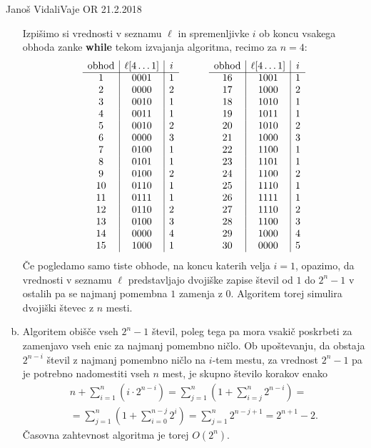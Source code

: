 \begin{naloga}{Janoš Vidali}{Vaje OR 21.2.2018}
\begin{odgovor}
\begin{enumerate}[(a)]
Izpišimo si vrednosti v seznamu $\ell$ in spremenljivke $i$
ob koncu vsakega obhoda zanke {\bf while} tekom izvajanja algoritma,
recimo za $n = 4$:
$$
\begin{array}{c|c|ccc|c|c}
\text{obhod} & \ell[4 \dots 1] & i &\qquad&
\text{obhod} & \ell[4 \dots 1] & i \\ \cline{1-3} \cline{5-7}
 1 & 0001 & 1 && 16 & 1001 & 1 \\
 2 & 0000 & 2 && 17 & 1000 & 2 \\
 3 & 0010 & 1 && 18 & 1010 & 1 \\
 4 & 0011 & 1 && 19 & 1011 & 1 \\
 5 & 0010 & 2 && 20 & 1010 & 2 \\
 6 & 0000 & 3 && 21 & 1000 & 3 \\
 7 & 0100 & 1 && 22 & 1100 & 1 \\
 8 & 0101 & 1 && 23 & 1101 & 1 \\
 9 & 0100 & 2 && 24 & 1100 & 2 \\
10 & 0110 & 1 && 25 & 1110 & 1 \\
11 & 0111 & 1 && 26 & 1111 & 1 \\
12 & 0110 & 2 && 27 & 1110 & 2 \\
13 & 0100 & 3 && 28 & 1100 & 3 \\
14 & 0000 & 4 && 29 & 1000 & 4 \\
15 & 1000 & 1 && 30 & 0000 & 5 \\
\end{array}
$$
Če pogledamo samo tiste obhode, na koncu katerih velja $i = 1$, opazimo,
da vrednosti v seznamu $\ell$ predstavljajo
dvojiške zapise števil od $1$ do $2^n - 1$
v ostalih pa se najmanj pomembna $1$ zamenja z $0$.
Algoritem torej simulira dvojiški števec z $n$ mesti.

\item Algoritem obišče vseh $2^n - 1$ števil,
poleg tega pa mora vsakič poskrbeti za zamenjavo vseh enic
za najmanj pomembno ničlo.
Ob upoštevanju, da obstaja $2^{n-i}$ števil
z najmanj pomembno ničlo na $i$-tem mestu,
za vrednost $2^n - 1$ pa je potrebno nadomestiti vseh $n$ mest,
je skupno število korakov enako
\begin{multline*}
n + \sum_{i=1}^n (i \cdot 2^{n-i}) =
\sum_{j=1}^n \left(1 + \sum_{i=j}^n 2^{n-i}\right) = \\
= \sum_{j=1}^n \left(1 + \sum_{i=0}^{n-j} 2^i\right) =
\sum_{j=1}^n 2^{n-j+1} = 2^{n+1} - 2 .
\end{multline*}
Časovna zahtevnost algoritma je torej $O(2^n)$.
\end{enumerate}
\end{odgovor}
\end{naloga}


